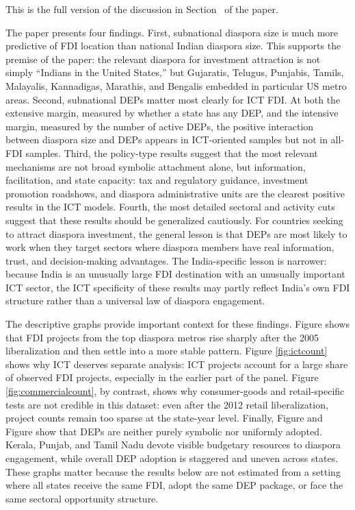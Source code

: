 \documentclass[12pt]{article}
\begin{document}
This is the full version of the discussion in Section~ of the paper.

The paper presents four findings. First, subnational diaspora size is much more predictive of FDI location than national Indian diaspora size. This supports the premise of the paper: the relevant diaspora for investment attraction is not simply ``Indians in the United States,'' but Gujaratis, Telugus, Punjabis, Tamils, Malayalis, Kannadigas, Marathis, and Bengalis embedded in particular US metro areas. Second, subnational DEPs matter most clearly for ICT FDI. At both the extensive margin, measured by whether a state has any DEP, and the intensive margin, measured by the number of active DEPs, the positive interaction between diaspora size and DEPs appears in ICT-oriented samples but not in all-FDI samples. Third, the policy-type results suggest that the most relevant mechanisms are not broad symbolic attachment alone, but information, facilitation, and state capacity: tax and regulatory guidance, investment promotion roadshows, and diaspora administrative units are the clearest positive results in the ICT models. Fourth, the most detailed sectoral and activity cuts suggest that these results should be generalized cautiously. For countries seeking to attract diaspora investment, the general lesson is that DEPs are most likely to work when they target sectors where diaspora members have real information, trust, and decision-making advantages. The India-specific lesson is narrower: because India is an unusually large FDI destination with an unusually important ICT sector, the ICT specificity of these results may partly reflect India's own FDI structure rather than a universal law of diaspora engagement.

The descriptive graphs provide important context for these findings. Figure  shows that FDI projects from the top diaspora metros rise sharply after the 2005 liberalization and then settle into a more stable pattern. Figure \ref{fig:ictcount} shows why ICT deserves separate analysis: ICT projects account for a large share of observed FDI projects, especially in the earlier part of the panel. Figure \ref{fig:commercialcount}, by contrast, shows why consumer-goods and retail-specific tests are not credible in this dataset: even after the 2012 retail liberalization, project counts remain too sparse at the state-year level. Finally, Figure  and Figure  show that DEPs are neither purely symbolic nor uniformly adopted. Kerala, Punjab, and Tamil Nadu devote visible budgetary resources to diaspora engagement, while overall DEP adoption is staggered and uneven across states. These graphs matter because the results below are not estimated from a setting where all states receive the same FDI, adopt the same DEP package, or face the same sectoral opportunity structure.
\end{document}
